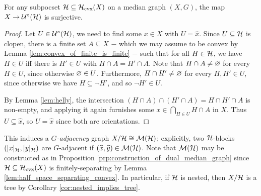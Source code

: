 \documentclass[reqno]{amsart}
\begin{document}
    \begin{lemma}\label{lem:H_blocks_form_a_median_graph}
        For any subpocset $\mc{H}\subseteq\mc{H}_\mathrm{cvx}(X)$ on a median graph $(X,G)$, the map $X\to\mc{U}^\circ(\mc{H})$ is surjective.
    \end{lemma}
    \begin{proof}
        Let $U\in\mc{U}^\circ(\mc{H})$, we need to find some $x\in X$ with $U=\widehat{x}$. Since $U\subseteq\mc{H}$ is clopen, there is a finite set $A\subseteq X$ $-$ which we may assume to be convex by Lemma \ref{lem:convex_of_finite_is_finite} $-$ such that for all $H\in\mc{H}$, we have $H\in U$ iff there is $H'\in U$ with $H\cap A=H'\cap A$. Note that $H\cap A\neq\em$ for every $H\in U$, since otherwise $\em\in U$. Furthermore, $H\cap H'\neq\em$ for every $H,H'\in U$, since otherwise we have $H\subseteq\lnot H'$, and so $\lnot H'\in U$.

        By Lemma \ref{lem:helly}, the intersection $(H\cap A)\cap(H'\cap A)=H\cap H'\cap A$ is non-empty, and applying it again furnishes some $x\in\bigcap_{H\in U}H\cap A$ in $X$. Thus $U\subseteq\widehat{x}$, so $U=\widehat{x}$ since both are orientations.
    \end{proof}

    This induces a \textit{$G$-adjacency} graph $X/\mc{H}\iso\mc{M}(\mc{H})$; explicitly, two $\mc{H}$-blocks $([x]_\mc{H},[y]_\mc{H})$ are $G$-adjacent if $(\widehat{x},\widehat{y})\in\mc{M}(\mc{H})$. Note that $\mc{M}(\mc{H})$ may be constructed as in Proposition \ref{prp:construction_of_dual_median_graph} since $\mc{H}\subseteq\mc{H}_\mathrm{cvx}(X)$ is finitely-separating by Lemma \ref{lem:half_space_separating_convex}. In particular, if $\mc{H}$ is nested, then $X/\mc{H}$ is a tree by Corollary \ref{cor:nested_implies_tree}.
\end{document}
